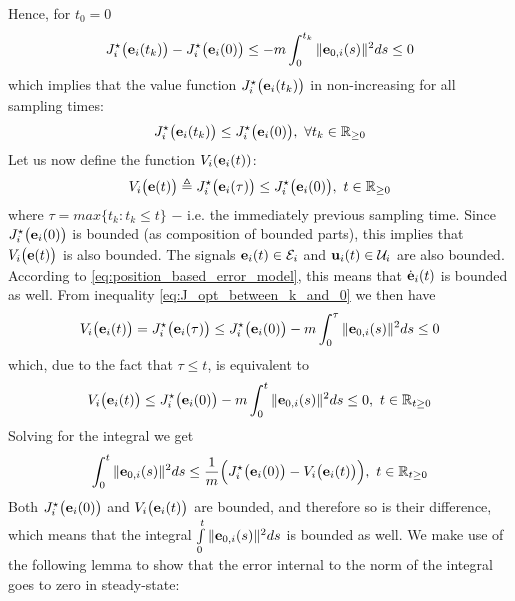 Hence, for $t_0 = 0$
\begin{align}
  J_i^{\star}\big(\bm{\mathbf{e}}_i(t_{k})\big) - J_i^{\star}\big(\bm{\mathbf{e}}_i(0)\big) \leq
    -m \int_{0}^{t_{k}} \|\bm{\mathbf{e}}_{0,i}(s)\|^2 ds \leq 0
\label{eq:J_opt_between_k_and_0}
\end{align}
which implies that the value function $J_i^{\star}\big(\bm{\mathbf{e}}_i(t_{k})\big)$
in non-increasing for all sampling times:
\begin{align}
  J_i^{\star}\big(\bm{\mathbf{e}}_i(t_{k})\big) \leq J_i^{\star}\big(\bm{\mathbf{e}}_i(0)\big),\ \forall t_k \in \mathbb{R}_{\geq0}
\end{align}
Let us now define the function $V_i(\bm{\mathbf{e}}_i(t))$:
\begin{align}
  V_i\big(\bm{\mathbf{e}}(t)\big) \triangleq J_i^{\star}\big(\bm{\mathbf{e}}_i(\tau)\big) \leq J_i^{\star}\big(\bm{\mathbf{e}}_i(0)\big),\ t \in \mathbb{R}_{\geq0}
\end{align}
where $\tau = max\{t_k : t_k \leq t\}$ $-$ i.e. the immediately previous sampling
time. Since $J_i^{\star}\big(\bm{\mathbf{e}}_i(0)\big)$
is bounded (as composition of bounded parts), this implies
that $V_i\big(\bm{\mathbf{e}}(t)\big)$ is also bounded. The signals
$\bm{\mathbf{e}}_i(t) \in \mathcal{E}_i$ and $\bm{\mathbf{u}}_i(t) \in \mathcal{U}_i$
are also bounded. According to \eqref{eq:position_based_error_model}, this
means that $\dot{\bm{\mathbf{e}}}_i(t)$ is bounded as well. From inequality
\eqref{eq:J_opt_between_k_and_0} we then have
\begin{align}
  V_i\big(\bm{\mathbf{e}}_i(t)\big) = J_i^{\star}\big(\bm{\mathbf{e}}_i(\tau)\big) \leq J_i^{\star}\big(\bm{\mathbf{e}}_i(0)\big)
    -m \int_{0}^{\tau} \|\bm{\mathbf{e}}_{0,i}(s)\|^2 ds \leq 0
\end{align}
which, due to the fact that $\tau \leq t$, is equivalent to
\begin{align}
  V_i\big(\bm{\mathbf{e}}_i(t)\big) \leq J_i^{\star}\big(\bm{\mathbf{e}}_i(0)\big) -m \int_{0}^{t} \|\bm{\mathbf{e}}_{0,i}(s)\|^2 ds \leq 0,\ t \in \mathbb{R}_{t\geq 0}
\end{align}
Solving for the integral we get
\begin{align}
  \int_{0}^{t} \|\bm{\mathbf{e}}_{0,i}(s)\|^2 ds \leq
    \dfrac{1}{m}\Big(J_i^{\star}\big(\bm{\mathbf{e}}_i(0)\big) - V_i\big(\bm{\mathbf{e}}_i(t)\big)\Big),\ t \in \mathbb{R}_{t\geq 0}
\end{align}
Both $J_i^{\star}\big(\bm{\mathbf{e}}_i(0)\big)$ and $V_i\big(\bm{\mathbf{e}}_i(t)\big)$
are bounded, and therefore so is their difference, which means that the
integral $\int\limits_{0}^{t} \|\bm{\mathbf{e}}_{0,i}(s)\|^2 ds$ is bounded as well.
We make use of the following lemma to show that the error internal to the
norm of the integral goes to zero in steady-state:

